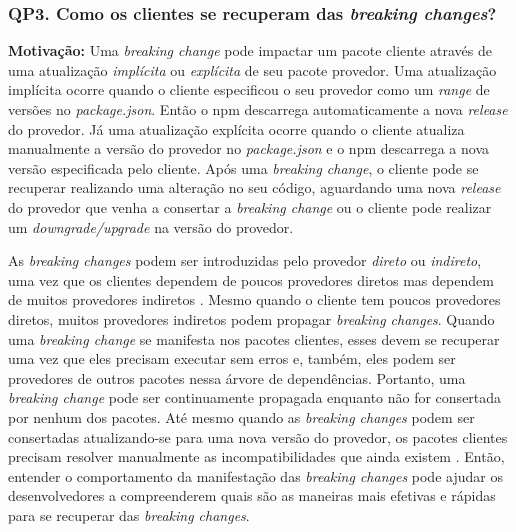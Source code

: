 
\subsubsection{\large QP3. Como os clientes se recuperam das \textit{breaking changes}?}
\label{sec:qp3}

\textbf{Motivação:}
Uma \textit{breaking change} pode impactar um pacote cliente através de uma atualização \textit{implícita} ou \textit{explícita} de seu pacote provedor. Uma atualização implícita ocorre quando o cliente especificou o seu provedor como um \textit{range} de versões no \textit{package.json}. Então o \textsf{npm} descarrega automaticamente a nova \textit{release} do provedor. Já uma atualização explícita ocorre quando o cliente atualiza manualmente a versão do provedor no \textit{package.json} e o \textsf{npm} descarrega a nova versão especificada pelo cliente. Após uma \textit{breaking change}, o cliente pode se recuperar realizando uma alteração no seu código, aguardando uma nova \textit{release} do provedor que venha a consertar a \textit{breaking change} ou o cliente pode realizar um \textit{downgrade/upgrade} na versão do provedor.

As \textit{breaking changes} podem ser introduzidas pelo provedor \textit{direto} ou \textit{indireto}, uma vez que os clientes dependem de poucos provedores diretos mas dependem de muitos provedores indiretos \cite{npm-seven}. Mesmo quando o cliente tem poucos provedores diretos, muitos provedores indiretos podem propagar \textit{breaking changes}. Quando uma \textit{breaking change} se manifesta nos pacotes clientes, esses devem se recuperar uma vez que eles precisam executar sem erros e, também, eles podem ser provedores de outros pacotes nessa árvore de dependências. Portanto, uma \textit{breaking change} pode ser continuamente propagada enquanto não for consertada por nenhum dos pacotes. Até mesmo quando as \textit{breaking changes} podem ser consertadas atualizando-se para uma nova versão do provedor, os pacotes clientes precisam resolver manualmente as incompatibilidades que ainda existem \cite{Foo:2018:ESC:3236024.3275535}. Então, entender o comportamento da manifestação das \textit{breaking changes} pode ajudar os desenvolvedores a compreenderem quais são as maneiras mais efetivas e rápidas para se recuperar das \textit{breaking changes}.
\newline

